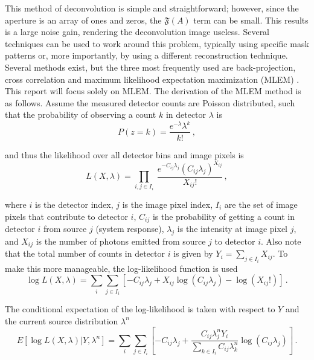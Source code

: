 \documentclass[10pt]{article}
\begin{document}
\noindent This method of deconvolution is simple and straightforward; however, since the aperture is an array of ones and zeros, the $\mathfrak{F}(A)$ term can be small. This results is a large noise gain, rendering the deconvolution image useless. Several techniques can be used to work around this problem, typically using specific mask patterns or, more importantly, by using a different reconstruction technique. Several methods exist, but the three most frequently used are back-projection, cross correlation and maximum likelihood expectation maximization (MLEM) \cite{LangeCarson1984}. This report will focus solely on MLEM. The derivation of the MLEM method is as follows. Assume the measured detector counts are Poisson distributed, such that the probability of observing a count $k$ in detector $\lambda$ is 
%
\begin{equation}
	P(z=k)  = \frac{e^{-\lambda} \lambda^k}{k!}\,,
\end{equation}

\noindent and thus the likelihood over all detector bins and image pixels is 
%
\begin{equation}
	L(X,\lambda) = \prod_{i,j\in I_i} \ \frac{e^{-C_{ij}\lambda_j} (C_{ij}\lambda_j)^{X_{ij}}}{X_{ij}!}\,,
\end{equation}

\noindent where $i$ is the detector index, $j$ is the image pixel index, $I_i$ are the set of image pixels that contribute to detector $i$, $C_{ij}$ is the probability of getting a count in detector $i$ from source $j$ (system response), $\lambda_j$ is the intensity at image pixel $j$, and $X_{ij}$ is the number of photons emitted from source $j$ to detector $i$. Also note that the total number of counts in detector $i$ is given by $Y_i=\sum_{j \in I_i} X_{ij}$. To make this more manageable, the log-likelihood function is used
%
\begin{equation}
	\log L(X,\lambda) = \sum_i \sum_{j \in I_i} \left[ -C_{ij} \lambda_j + X_{ij} \log (C_{ij} \lambda_j) - \log (X_{ij}!) \right]\,.
\end{equation}

\noindent The conditional expectation of the log-likelihood is taken with respect to $Y$ and the current source distribution $\lambda^n$
%
\begin{equation}
	E[\log L(X,\lambda) | Y,\lambda^n] = \sum_i \sum_{j \in I_i} \left[   -C_{ij} \lambda_j + \frac{C_{ij}\lambda_j^n Y_i}{\sum_{k \in I_i}C_{ij}\lambda_k^n }   \log (C_{ij} \lambda_j)   \right]\,.
\end{equation}
\end{document}
